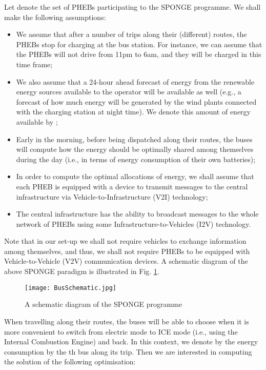 \documentclass[journal]{IEEEtran}
\begin{document}
Let  denote the set of  PHEBs participating to the SPONGE programme. We shall make the following assumptions:
\begin{itemize}
	\item
	We assume that after a number of trips along their (different) routes, the  PHEBs stop for charging at the bus station. For instance, we can assume that the PHEBs will not drive from 11pm to 6am, and they will be charged in this time frame;
	\item
	We also assume that a 24-hour ahead forecast of energy from the renewable energy sources available to the operator will be available as well (e.g., a forecast of how much energy will be generated by the wind plants connected with the charging station at night time). We denote this amount of energy available by ;
	\item
	Early in the morning, before being dispatched along their routes, the buses will compute how the energy  should be optimally shared among themselves during the day (i.e., in terms of energy consumption of their own batteries);
	\item
	In order to compute the optimal allocations of energy, we shall assume that each PHEB is equipped with a device to transmit messages to the central infrastructure via Vehicle-to-Infrastructure (V2I) technology;
	\item
	The central infrastructure has the ability to broadcast messages to the whole network of PHEBs using some Infrastructure-to-Vehicles (I2V) technology.
\end{itemize}
Note that in our set-up we shall not require vehicles to exchange information among themselves, and thus, we shall not require PHEBs to be equipped with Vehicle-to-Vehicle (V2V) communication devices. A schematic diagram of the above SPONGE paradigm is illustrated in Fig. \ref{feedbackLoop}.\newline
\begin{figure}[htbp]
	\begin{center}
		{\texttt{[image: BusSchematic.jpg]}}
		\caption{A schematic diagram of the SPONGE programme}
		\label{feedbackLoop}
	\end{center}
\end{figure}

When travelling along their routes, the buses will be able to choose when it is more convenient to switch from electric mode to ICE mode (i.e., using the Internal Combustion Engine) and back. In this context, we denote by  the energy consumption by the th bus along its trip. Then we are interested in computing the solution of the following optimisation:
\end{document}
